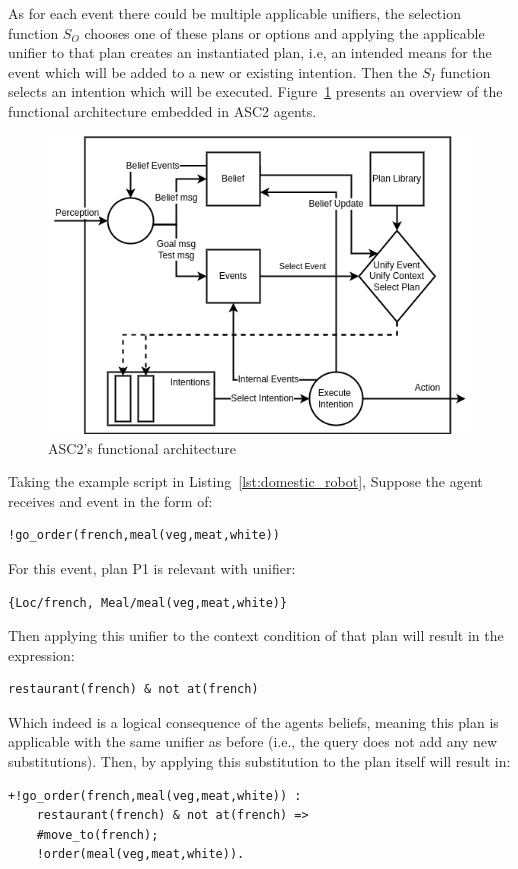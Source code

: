 As for each event there could be multiple applicable unifiers, the selection function $S_O$ chooses one of these plans or options and applying the applicable unifier to that plan creates an instantiated plan, i.e, an intended means for the event which will be added to a new or existing intention. Then the $S_I$ function selects an intention which will be executed. Figure~\ref{fig:asc2func} presents an overview of the functional architecture embedded in ASC2 agents.

\begin{figure}[t!]
  \centering
  \includegraphics[width=0.70\linewidth]{ch2/asc2arch.drawio.png}
  \caption{ASC2's functional architecture}
  \label{fig:asc2func}
\end{figure}


Taking the example script in Listing~\ref{lst:domestic_robot}, Suppose the agent receives and event in the form of: 
\begin{verbatim}
!go_order(french,meal(veg,meat,white))
\end{verbatim}
\noindent For this event, plan P1 is relevant with unifier:
\begin{verbatim}
{Loc/french, Meal/meal(veg,meat,white)}
\end{verbatim}
Then applying this unifier to the context condition of that plan will result in the expression:
\begin{verbatim}
restaurant(french) & not at(french)
\end{verbatim}
Which indeed is a logical consequence of the agents beliefs, meaning this plan is applicable with the same unifier as before (i.e., the query does not add any new substitutions). Then, by applying this substitution to the plan itself will result in:
\begin{verbatim}
+!go_order(french,meal(veg,meat,white)) :
    restaurant(french) & not at(french) =>
    #move_to(french);
    !order(meal(veg,meat,white)).
\end{verbatim}

